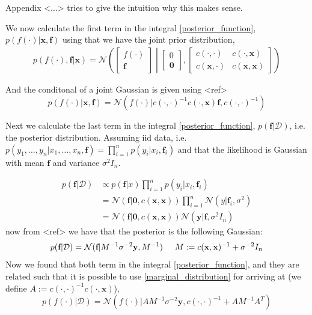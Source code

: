 Appendix <...> tries to give the intuition why this makes sense. 

We now calculate the first term in the integral \eqref{posterior_function}, 
$p(f(\cdot)|\textbf{x}, \textbf{f})$ using that we have the joint prior 
distribution, 
\begin{align}
    p(f(\cdot),\textbf{f}|\textbf{x}) = \mathcal{N}\left(\begin{bmatrix}
        f(\cdot)\\ \textbf{f}
    \end{bmatrix} \middle| \begin{bmatrix}
        0\\ \textbf{0}
    \end{bmatrix}, \begin{bmatrix}
        c(\cdot, \cdot) & c(\cdot,\textbf{x})\\
        c(\textbf{x}, \cdot) & c(\textbf{x}, \textbf{x})
    \end{bmatrix} \right)
\end{align}

And the conditonal of a joint Gaussian is given using <ref> 
$$p(f(\cdot)|\textbf{x}, \textbf{f}) = \mathcal{N}(f(\cdot)|c(\cdot, \cdot)^{-1}c(\cdot, \textbf{x})\textbf{f}, c(\cdot, \cdot)^{-1})$$

Next we calculate the last term in the integral \eqref{posterior_function}, 
$p(\textbf{f}|\mathcal{D})$, i.e. the posterior distribution. Assuming iid data, 
i.e. $p(y_1,\dots, y_n|x_1,\dots, x_n, \textbf{f}) = \prod_{i=1}^n p(y_i|x_i,\textbf{f}_i)$
and that the likelihood is Gaussian with mean $\textbf{f}$ and variance $\sigma^2 I_n$. 

\begin{align*}
    p(\textbf{f}|\mathcal{D}) &\propto p(\textbf{f}|x)\prod_{i=1}^n p(y_i|x_i,\textbf{f}_i)\\
    &= \mathcal{N}(\textbf{f}|\textbf{0},c(\textbf{x}, \textbf{x})) \prod_{i=1}^n \mathcal{N}(y|\textbf{f}_i,\sigma^2)\\
    &= \mathcal{N}(\textbf{f}|\textbf{0}, c(\textbf{x}, \textbf{x})) \mathcal{N}(\textbf{y}|\textbf{f},\sigma^2 I_n)
\end{align*}
now from <ref> we have that the posterior is the following Gaussian: 
\begin{equation*}
    p(\textbf{f}|\mathcal{D}) = \mathcal{N}(\textbf{f}|M^{-1} \sigma^{-2}\textbf{y}, M^{-1}) \hspace{0.5cm}M := c(\textbf{x}, \textbf{x})^{-1}+\sigma^{-2} I_n
\end{equation*}
Now we found that both term in the integral \eqref{posterior_function}, and they
are related such that it is possible to use \eqref{marginal_distribution} for arriving 
at (we define $A :=  c(\cdot, \cdot)^{-1} c(\cdot, \textbf{x})$), 
$$p(f(\cdot)|\mathcal{D}) = \mathcal{N}(f(\cdot)|AM^{-1}\sigma^{-2}\textbf{y}, c(\cdot, \cdot)^{-1}+
AM^{-1}A^T)$$

